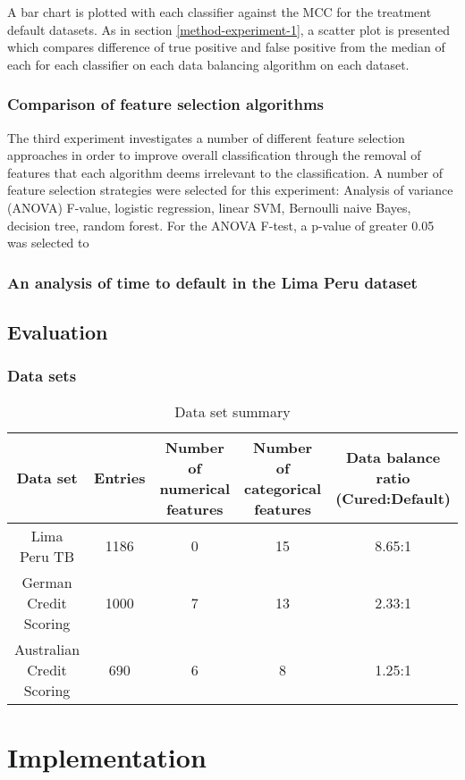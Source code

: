 \documentclass{sig-alternate-05-2015}
\begin{document}
	A bar chart is plotted with each classifier against the MCC for the treatment default datasets. As in section \ref{method-experiment-1}, a scatter plot is presented which compares difference of true positive and false positive from the median of each for each classifier on each data balancing algorithm on each dataset. 
	
	\subsubsection{Comparison of feature selection algorithms}
	The third experiment investigates a number of different feature selection approaches in order to improve overall classification through the removal of features that each algorithm deems irrelevant to the classification. A number of feature selection strategies were selected for this experiment: Analysis of variance (ANOVA) F-value, logistic regression, linear SVM, Bernoulli naive Bayes, decision tree, random forest. For the ANOVA F-test, a p-value of greater 0.05 was selected to 
	\subsubsection{An analysis of time to default in the Lima Peru dataset}
	
	\subsection{Evaluation}
	
	\subsubsection{Data sets}
	\begin{table*}
		\centering
		\caption{Data set summary}
		\label{table:australian_dataset}
		\begin{tabular}{c|c|c|c|c} \hline	
			Data set&Entries&Number of numerical features&Number of categorical features&Data balance ratio (Cured:Default)\\ \hline
			Lima Peru TB \cite{Lackey:10356751520150601}&1186&0&15&8.65:1 \\
			German Credit Scoring&1000&7&13&2.33:1 \\
			Australian Credit Scoring&690&6&8&1.25:1
		\end{tabular}
	\end{table*}
	
	\section{Implementation}
	
\end{document}
